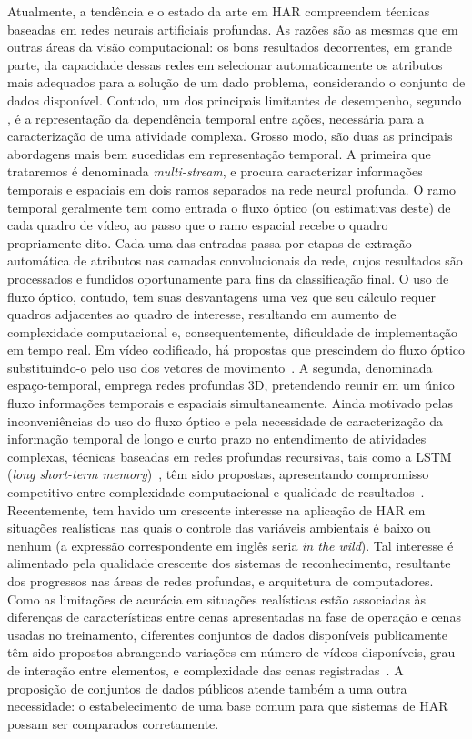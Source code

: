 Atualmente, a tendência e o estado da arte em HAR compreendem técnicas baseadas em redes neurais artificiais profundas. As razões são as mesmas que em outras áreas da visão computacional: os bons resultados decorrentes, em grande parte, da capacidade dessas redes em selecionar automaticamente os atributos mais adequados para a solução de um dado problema, considerando o conjunto de dados disponível. Contudo, um dos principais limitantes de desempenho, segundo \textcite{yao-2019}, é a representação da dependência temporal entre ações, necessária para a caracterização de uma atividade complexa. 
Grosso modo, são duas as principais abordagens mais bem sucedidas em representação temporal. A primeira que trataremos é denominada \emph{multi-stream}, e procura caracterizar informações temporais e espaciais em dois ramos separados na rede neural profunda. O ramo temporal geralmente tem como entrada o fluxo óptico (ou estimativas deste) de cada quadro de vídeo, ao passo que o ramo espacial recebe o quadro propriamente dito. Cada uma das entradas passa por etapas de extração automática de atributos nas camadas convolucionais da rede, cujos resultados são processados e fundidos oportunamente para fins da classificação final. O uso de fluxo óptico, contudo, tem suas desvantagens uma vez que seu cálculo requer quadros adjacentes ao quadro de interesse, resultando em aumento de complexidade computacional e, consequentemente, dificuldade de implementação em tempo real. Em vídeo codificado, há propostas que prescindem do fluxo óptico substituindo-o pelo uso dos vetores de movimento~\parencite{yao-2019}. A segunda, denominada espaço-temporal, emprega redes profundas 3D, pretendendo reunir em um único fluxo informações temporais e espaciais simultaneamente. Ainda motivado pelas inconveniências do uso do fluxo óptico e pela necessidade de caracterização da informação temporal de longo e curto prazo no entendimento de atividades complexas, técnicas baseadas em redes profundas recursivas, tais como a LSTM (\emph{long short-term memory})~\parencite{hochreiter-1997}, têm sido propostas, apresentando compromisso competitivo entre complexidade computacional e qualidade de resultados~\parencite{donahue-2016, herath-2017, xia-2020}.
Recentemente, tem havido um crescente interesse na aplicação de HAR em situações realísticas nas quais o controle das variáveis ambientais é baixo ou nenhum (a expressão correspondente em inglês seria \emph{in the wild}). Tal interesse é alimentado pela qualidade crescente dos sistemas de reconhecimento, resultante dos progressos nas áreas de redes profundas, e arquitetura de computadores. Como as limitações de acurácia em situações realísticas estão associadas às diferenças de características entre cenas apresentadas na fase de operação e cenas usadas no treinamento, diferentes conjuntos de dados disponíveis publicamente têm sido propostos abrangendo variações em número de vídeos disponíveis, grau de interação entre elementos, e complexidade das cenas registradas~\parencite{jegham-2020, kongr-2018}. A proposição de conjuntos de dados públicos atende também a uma outra necessidade: o estabelecimento de uma base comum para que sistemas de HAR possam ser comparados corretamente.
